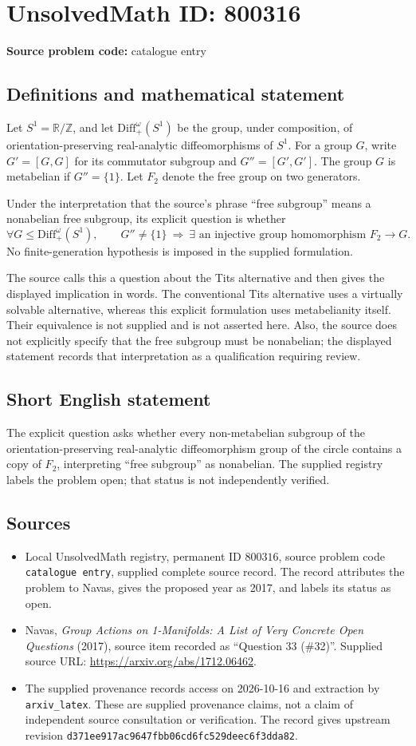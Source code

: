 \documentclass[11pt]{article}
\newcommand{\Z}{\mathbb{Z}}
\newcommand{\R}{\mathbb{R}}
\begin{document}
\section*{UnsolvedMath ID: 800316}
\textbf{Source problem code:} catalogue entry
\subsection{Definitions and mathematical statement}
Let \(S^1=\R/\Z\), and let \(\mathrm{Diff}^{\omega}_+(S^1)\) be the group, under composition, of orientation-preserving real-analytic diffeomorphisms of \(S^1\). For a group \(G\), write \(G'=[G,G]\) for its commutator subgroup and \(G''=[G',G']\). The group \(G\) is metabelian if \(G''=\{1\}\). Let \(F_2\) denote the free group on two generators.

Under the interpretation that the source's phrase ``free subgroup'' means a nonabelian free subgroup, its explicit question is whether
\[
\forall G\leq \mathrm{Diff}^{\omega}_+(S^1),\qquad
G''\neq\{1\}\ \Longrightarrow\ \exists\text{ an injective group homomorphism }F_2\longrightarrow G.
\]
No finite-generation hypothesis is imposed in the supplied formulation.

The source calls this a question about the Tits alternative and then gives the displayed implication in words. The conventional Tits alternative uses a virtually solvable alternative, whereas this explicit formulation uses metabelianity itself. Their equivalence is not supplied and is not asserted here. Also, the source does not explicitly specify that the free subgroup must be nonabelian; the displayed statement records that interpretation as a qualification requiring review.
\subsection{Short English statement}
The explicit question asks whether every non-metabelian subgroup of the orientation-preserving real-analytic diffeomorphism group of the circle contains a copy of \(F_2\), interpreting ``free subgroup'' as nonabelian. The supplied registry labels the problem open; that status is not independently verified.
\subsection{Sources}
\begin{itemize}
\item Local UnsolvedMath registry, permanent ID \(800316\), source problem code \texttt{catalogue entry}, supplied complete source record. The record attributes the problem to Navas, gives the proposed year as 2017, and labels its status as open.
\item Navas, \emph{Group Actions on 1-Manifolds: A List of Very Concrete Open Questions} (2017), source item recorded as ``Question 33 (\#32)''. Supplied source URL: \url{https://arxiv.org/abs/1712.06462}.
\item The supplied provenance records access on 2026-10-16 and extraction by \texttt{arxiv\_latex}. These are supplied provenance claims, not a claim of independent source consultation or verification. The record gives upstream revision \texttt{d371ee917ac9647fbb06cd6fc529deec6f3dda82}.
\end{itemize}
\end{document}
